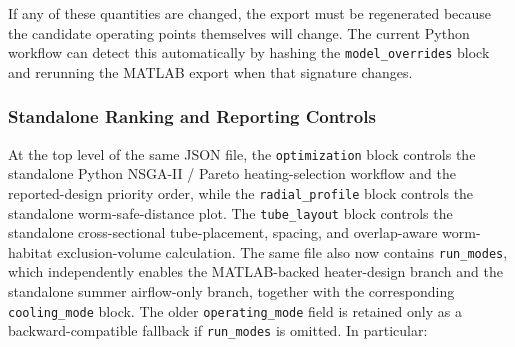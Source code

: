 \documentclass{article}
\begin{document}
If any of these quantities are changed, the export must be regenerated
because the candidate operating points themselves will change. The current
Python workflow can detect this automatically by hashing the
\texttt{model\_overrides} block and rerunning the MATLAB export when that
signature changes.

\subsubsection{Standalone Ranking and Reporting Controls}

At the top level of the same JSON file, the \texttt{optimization} block
controls the standalone Python NSGA-II / Pareto heating-selection workflow
and the reported-design priority order, while the \texttt{radial\_profile} block controls the standalone worm-safe-distance
plot. The \texttt{tube\_layout} block controls the standalone cross-sectional
tube-placement, spacing, and overlap-aware worm-habitat exclusion-volume
calculation. The same file also now contains \texttt{run\_modes}, which
independently enables the MATLAB-backed heater-design branch and the
standalone summer airflow-only branch, together with the corresponding
\texttt{cooling\_mode} block. The older \texttt{operating\_mode} field is
retained only as a backward-compatible fallback if \texttt{run\_modes} is
omitted. In particular:
\end{document}
